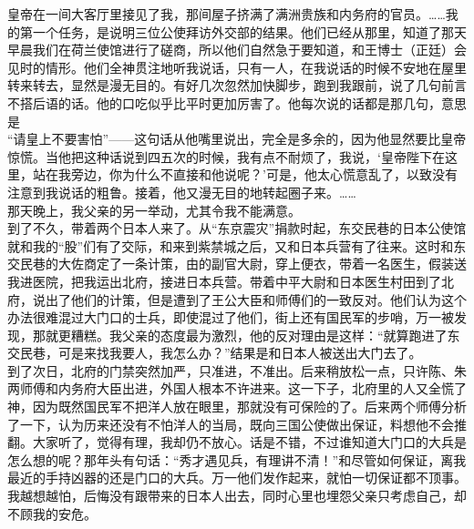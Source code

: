皇帝在一间大客厅里接见了我，那间屋子挤满了满洲贵族和内务府的官员。……我的第一个任务，是说明三位公使拜访外交部的结果。他们已经从那里，知道了那天早晨我们在荷兰使馆进行了磋商，所以他们自然急于要知道，和王博士（正廷）会见时的情形。他们全神贯注地听我说话，只有一人，在我说话的时候不安地在屋里转来转去，显然是漫无目的。有好几次忽然加快脚步，跑到我跟前，说了几句前言不搭后语的话。他的口吃似乎比平时更加厉害了。他每次说的话都是那几句，意思是\\

“请皇上不要害怕”——这句话从他嘴里说出，完全是多余的，因为他显然要比皇帝惊慌。当他把这种话说到四五次的时候，我有点不耐烦了，我说，‘皇帝陛下在这里，站在我旁边，你为什么不直接和他说呢？’可是，他太心慌意乱了，以致没有注意到我说话的粗鲁。接着，他又漫无目的地转起圈子来。……\\

那天晚上，我父亲的另一举动，尤其令我不能满意。\\

到了不久，带着两个日本人来了。从“东京震灾”捐款时起，东交民巷的日本公使馆就和我的“股”们有了交际，和来到紫禁城之后，又和日本兵营有了往来。这时和东交民巷的大佐商定了一条计策，由的副官大尉，穿上便衣，带着一名医生，假装送我进医院，把我运出北府，接进日本兵营。带着中平大尉和日本医生村田到了北府，说出了他们的计策，但是遭到了王公大臣和师傅们的一致反对。他们认为这个办法很难混过大门口的士兵，即使混过了他们，街上还有国民军的步哨，万一被发现，那就更糟糕。我父亲的态度最为激烈，他的反对理由是这样：“就算跑进了东交民巷，可是来找我要人，我怎么办？”结果是和日本人被送出大门去了。\\

到了次日，北府的门禁突然加严，只准进，不准出。后来稍放松一点，只许陈、朱两师傅和内务府大臣出进，外国人根本不许进来。这一下子，北府里的人又全慌了神，因为既然国民军不把洋人放在眼里，那就没有可保险的了。后来两个师傅分析了一下，认为历来还没有不怕洋人的当局，既向三国公使做出保证，料想他不会推翻。大家听了，觉得有理，我却仍不放心。话是不错，不过谁知道大门口的大兵是怎么想的呢？那年头有句话：“秀才遇见兵，有理讲不清！”和尽管如何保证，离我最近的手持凶器的还是门口的大兵。万一他们发作起来，就怕一切保证都不顶事。我越想越怕，后悔没有跟带来的日本人出去，同时心里也埋怨父亲只考虑自己，却不顾我的安危。\\

